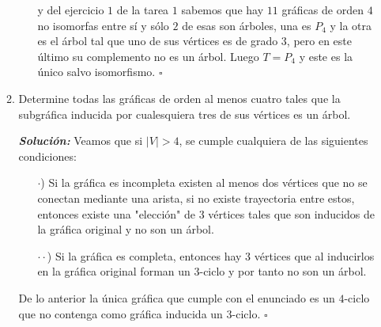 \documentclass{article}
\begin{document}
\begin{enumerate}
\begin{enumerate}
\begin{itemize}
        y del ejercicio $1$ de la tarea $1$ sabemos que hay $11$ gráficas
        de orden $4$ no isomorfas entre sí y sólo $2$ de esas son árboles,
        una es $P_4$ y la otra es el árbol tal que uno de sus vértices es
        de grado $3$, pero en este último su complemento no es un árbol.
        Luego  $T = P_4$ y este es la único  salvo isomorfismo.
        \hfill $\square$
        
      \end{itemize}
      
    \item Determine todas las gr\'aficas de orden al
      menos cuatro tales que la subgr\'afica inducida por
      cualesquiera tres de sus v\'ertices es un \'arbol.
      
      \textbf{\textit{Soluci\'on:}} 
      Veamos que si $|V| > 4$, se cumple cualquiera de las siguientes condiciones:
      \begin{itemize}
      \item[$\cdot$)] Si la gráfica es incompleta existen al menos dos vértices
        que no se conectan mediante una arista, si no existe trayectoria entre estos,
        entonces existe una "elección" de $3$ vértices tales que son inducidos de
        la gráfica original y no son un árbol.
        
      \item[$\cdot \cdot$)] Si la gráfica es completa, entonces hay $3$ vértices que
        al inducirlos en la gráfica original forman un $3$-ciclo y por tanto no son un árbol.
      \end{itemize}
      De lo anterior la única gráfica que cumple con el enunciado es un $4$-ciclo
      que no contenga como gráfica inducida un $3$-ciclo. \hfill $\square$
    \end{enumerate}
    
\end{enumerate}
\end{document}
